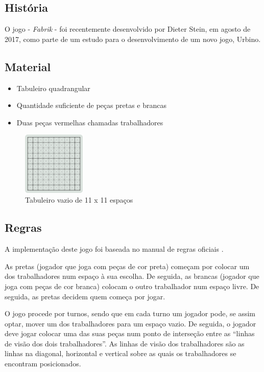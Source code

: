 \documentclass[a4paper]{article}
\begin{document}
\subsection{História}
O jogo - \textit{Fabrik} - foi recentemente desenvolvido por Dieter Stein, em agosto de 2017, como parte de um estudo para o desenvolvimento de um novo jogo, Urbino.

\subsection{Material}
\begin{itemize}
	\item Tabuleiro quadrangular
	\item Quantidade suficiente de peças pretas e brancas
	\item Duas peças vermelhas chamadas trabalhadores
\end{itemize}

\begin{figure}[h!]
\begin{center}
\includegraphics[height=3cm,width=3cm]{images/fabrik_empty_board.png}
\caption{Tabuleiro vazio de 11 x 11 espaços}
\label{Figura 1}
\end{center}
\end{figure}

\subsection{Regras}
A implementação deste jogo foi baseada no manual de regras oficiais \cite{games_and_puzzles_by_dieter_stein}.

As pretas (jogador que joga com peças de cor preta) começam por colocar um dos trabalhadores num espaço à sua escolha. De seguida, as brancas (jogador que joga com peças de cor branca) colocam o outro trabalhador num espaço livre. De seguida, as pretas decidem quem começa por jogar.

O jogo procede por turnos, sendo que em cada turno um jogador pode, se assim optar, mover um dos trabalhadores para um espaço vazio. De seguida, o jogador deve jogar colocar uma das suas peças num ponto de interseção entre as “linhas de visão dos dois trabalhadores”. As linhas de visão dos trabalhadores são as linhas na diagonal, horizontal e vertical sobre as quais os trabalhadores se encontram posicionados.
\end{document}

